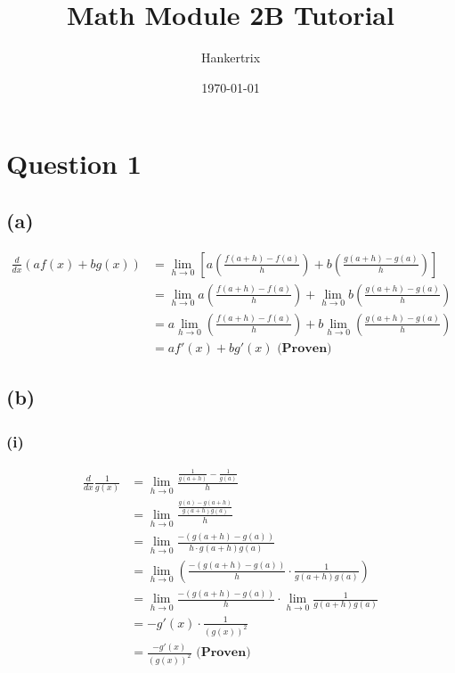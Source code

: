 \documentclass[11pt]{article}
\author{Hankertrix}
\date{\today}
\title{Math Module 2B Tutorial}
\begin{document}
\maketitle
\setcounter{tocdepth}{2}
\tableofcontents

\newpage

\section{Question 1}
\label{sec:org0632b77}

\subsection{(a)}
\label{sec:org7f98e9e}

\begin{align*}
\frac{d}{dx}(af(x) + bg(x)) &= \lim_{h \rightarrow 0} \left[a \left(\frac{f(a + h) - f(a)}{h} \right) + b \left( \frac{g(a + h) - g(a)}{h} \right) \right] \\
&= \lim_{h \rightarrow 0} a \left(\frac{f(a + h) - f(a)}{h} \right) + \lim_{h \rightarrow 0} b \left( \frac{g(a + h) - g(a)}{h} \right) \\
&= a \lim_{h \rightarrow 0} \left(\frac{f(a + h) - f(a)}{h} \right) + b \lim_{h \rightarrow 0} \left( \frac{g(a + h) - g(a)}{h} \right) \\
&= a f'(x) + b g'(x) \textbf{ (Proven)}
\end{align*}

\subsection{(b)}
\label{sec:orge7fa02d}

\subsubsection{(i)}
\label{sec:org66e056f}

\begin{align*}
\frac{d}{dx} \frac{1}{g(x)} &= \lim_{h \rightarrow 0} \frac{\frac{1}{g(a + h)} - \frac{1}{g(a)}}{h} \\
&= \lim_{h \rightarrow 0} \frac{\frac{g(a) - g(a + h)}{g(a + h) g(a)}}{h} \\
&= \lim_{h \rightarrow 0} \frac{-(g(a + h) - g(a))}{h \cdot g(a + h) g(a)} \\
&= \lim_{h \rightarrow 0} \left(\frac{-(g(a + h) - g(a))}{h} \cdot \frac{1}{g(a + h) g(a)} \right) \\
&= \lim_{h \rightarrow 0} \frac{-(g(a + h) - g(a))}{h} \cdot \lim_{h \rightarrow 0} \frac{1}{g(a + h) g(a)} \\
&= - g'(x) \cdot \frac{1}{(g(x))^2} \\
&= \frac{- g'(x)}{(g(x))^2} \textbf{ (Proven)}
\end{align*}
\end{document}
